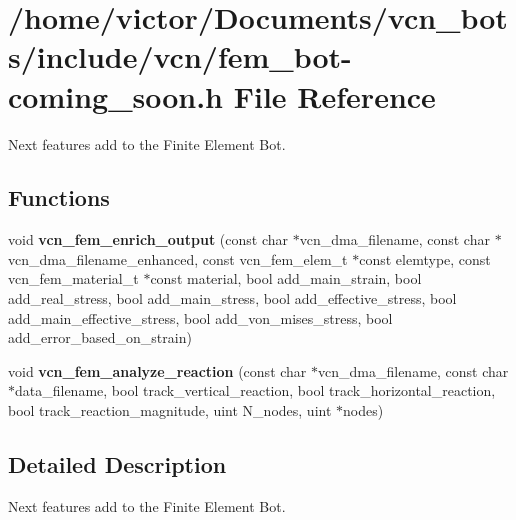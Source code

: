 \hypertarget{fem__bot-coming__soon_8h}{\section{/home/victor/\+Documents/vcn\+\_\+bots/include/vcn/fem\+\_\+bot-\/coming\+\_\+soon.h File Reference}
\label{fem__bot-coming__soon_8h}
}


Next features add to the Finite Element Bot.  


\subsection*{Functions}
\begin{DoxyCompactItemize}
\item 
\hypertarget{fem__bot-coming__soon_8h_a68db92ac75c7596f6063b0555a6172f0}{void {\bfseries vcn\+\_\+fem\+\_\+enrich\+\_\+output} (const char $\ast$vcn\+\_\+dma\+\_\+filename, const char $\ast$vcn\+\_\+dma\+\_\+filename\+\_\+enhanced, const vcn\+\_\+fem\+\_\+elem\+\_\+t $\ast$const elemtype, const vcn\+\_\+fem\+\_\+material\+\_\+t $\ast$const material, bool add\+\_\+main\+\_\+strain, bool add\+\_\+real\+\_\+stress, bool add\+\_\+main\+\_\+stress, bool add\+\_\+effective\+\_\+stress, bool add\+\_\+main\+\_\+effective\+\_\+stress, bool add\+\_\+von\+\_\+mises\+\_\+stress, bool add\+\_\+error\+\_\+based\+\_\+on\+\_\+strain)}\label{fem__bot-coming__soon_8h_a68db92ac75c7596f6063b0555a6172f0}

\item 
\hypertarget{fem__bot-coming__soon_8h_a3a7e0c05255014a232059a75cd89e336}{void {\bfseries vcn\+\_\+fem\+\_\+analyze\+\_\+reaction} (const char $\ast$vcn\+\_\+dma\+\_\+filename, const char $\ast$data\+\_\+filename, bool track\+\_\+vertical\+\_\+reaction, bool track\+\_\+horizontal\+\_\+reaction, bool track\+\_\+reaction\+\_\+magnitude, uint N\+\_\+nodes, uint $\ast$nodes)}\label{fem__bot-coming__soon_8h_a3a7e0c05255014a232059a75cd89e336}

\end{DoxyCompactItemize}


\subsection{Detailed Description}
Next features add to the Finite Element Bot. 

